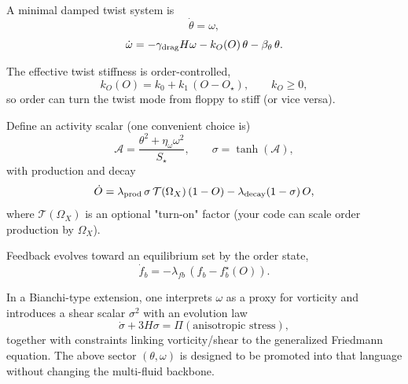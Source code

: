 \documentclass[11pt]{article}
\begin{document}
A minimal damped twist system is
\[
\dot\theta=\omega,
\]
\[
\dot\omega = -\gamma_{\rm drag} H \omega - k_O(O)\,\theta - \beta_\theta\,\theta.
\]

The effective twist stiffness is order-controlled,
\[
k_O(O)=k_0 + k_1\,(O-O_\star),
\qquad
k_O\ge 0,
\]
so order can turn the twist mode from floppy to stiff (or vice versa).

Define an activity scalar (one convenient choice is)
\[
\mathcal{A}=\frac{\theta^2+\eta_\omega \omega^2}{S_\star},
\qquad
\sigma=\tanh(\mathcal{A}),
\]
with production and decay
\[
\dot O = \lambda_{\rm prod}\,\sigma\,\mathcal{T}(\Omega_X)\,(1-O)
-\lambda_{\rm decay}(1-\sigma)\,O,
\]
where \(\mathcal{T}(\Omega_X)\) is an optional "turn-on" factor (your code can scale
order production by \(\Omega_X\)).

Feedback evolves toward an equilibrium set by the order state,
\[
\dot f_b = -\lambda_{fb}\,(f_b - f_b^\star(O)).
\]

In a Bianchi-type extension, one interprets \(\omega\) as a proxy for vorticity
and introduces a shear scalar \(\sigma^2\) with an evolution law
\[
\dot\sigma + 3H\sigma = \Pi(\text{anisotropic stress}),
\]
together with constraints linking vorticity/shear to the generalized Friedmann equation.
The above sector \((\theta,\omega)\) is designed to be promoted into that language
without changing the multi-fluid backbone.
\end{document}
